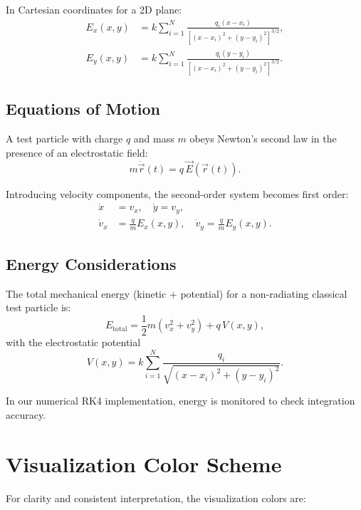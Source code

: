 \documentclass[12pt,a4paper]{article}
\begin{document}
In Cartesian coordinates for a 2D plane:
\begin{align}
    E_x(x,y) &= k \sum_{i=1}^N \frac{q_i (x - x_i)}{\left[(x-x_i)^2 + (y-y_i)^2\right]^{3/2}},\\
    E_y(x,y) &= k \sum_{i=1}^N \frac{q_i (y - y_i)}{\left[(x-x_i)^2 + (y-y_i)^2\right]^{3/2}}.
\end{align}

\subsection{Equations of Motion}
A test particle with charge $q$ and mass $m$ obeys Newton's second law in the presence of an electrostatic field:
\begin{equation}
    m\ddot{\vec{r}}(t) = q\,\vec{E}(\vec{r}(t)).
\end{equation}

Introducing velocity components, the second-order system becomes first order:
\begin{align}
    \dot{x} &= v_x,\quad \dot{y} = v_y,\\
    \dot{v}_x &= \frac{q}{m}E_x(x,y),\quad \dot{v}_y = \frac{q}{m}E_y(x,y).
\end{align}

\subsection{Energy Considerations}
The total mechanical energy (kinetic + potential) for a non-radiating classical test particle is:
\begin{equation}
    E_\text{total} = \frac{1}{2}m(v_x^2 + v_y^2) + q\,V(x,y),
\end{equation}
with the electrostatic potential
\begin{equation}
    V(x,y) = k\sum_{i=1}^N \frac{q_i}{\sqrt{(x-x_i)^2+(y-y_i)^2}}.
\end{equation}

In our numerical RK4 implementation, energy is monitored to check integration accuracy.

\section{Visualization Color Scheme}
For clarity and consistent interpretation, the visualization colors are:
\end{document}
